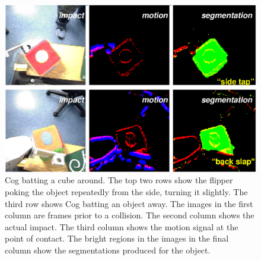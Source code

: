 %
\begin{figure}[tb]
\begin{center}
\includegraphics[width=\columnwidth]{segmentation-detail.eps}
\caption{ 
\label{fig:poking-segmentation}
%
Cog batting a cube around.  The top two rows show the flipper poking
the object repeatedly from the side, turning it slightly.  The third
row shows Cog batting an object away.  The images in the first column
are frames prior to a collision.  The second column shows the actual
impact.  The third column shows the motion signal at the point of
contact.  The bright regions in the images in the final column show
the segmentations produced for the object. 
%
}
\end{center}
\end{figure}
%

